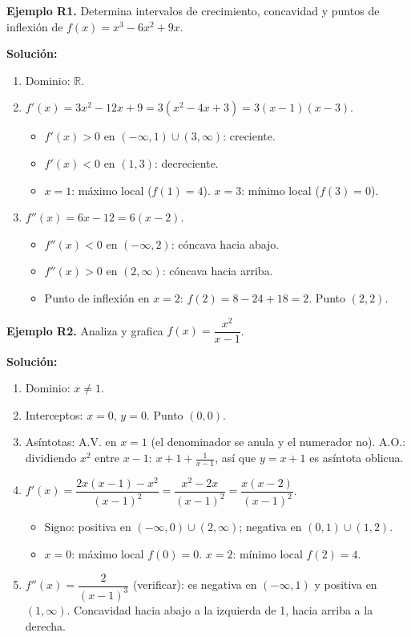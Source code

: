 \documentclass[12pt, letterpaper]{article}
\begin{document}
\textbf{Ejemplo R1.} Determina intervalos de crecimiento, concavidad y puntos de inflexión de $f(x) = x^3 - 6x^2 + 9x$.

\begin{cuadrosolucion}
  \textbf{Solución:}
  \begin{enumerate}
    \item Dominio: $\mathbb{R}$.
    \item $f'(x) = 3x^2 - 12x + 9 = 3(x^2 - 4x + 3) = 3(x - 1)(x - 3)$.
          \begin{itemize}
            \item $f'(x) > 0$ en $(-\infty, 1) \cup (3, \infty)$: creciente.
            \item $f'(x) < 0$ en $(1, 3)$: decreciente.
            \item $x = 1$: máximo local ($f(1) = 4$). $x = 3$: mínimo local ($f(3) = 0$).
          \end{itemize}
    \item $f''(x) = 6x - 12 = 6(x - 2)$.
          \begin{itemize}
            \item $f''(x) < 0$ en $(-\infty, 2)$: cóncava hacia abajo.
            \item $f''(x) > 0$ en $(2, \infty)$: cóncava hacia arriba.
            \item Punto de inflexión en $x = 2$: $f(2) = 8 - 24 + 18 = 2$. Punto $(2, 2)$.
          \end{itemize}
  \end{enumerate}
\end{cuadrosolucion}

\textbf{Ejemplo R2.} Analiza y grafica $f(x) = \dfrac{x^2}{x - 1}$.

\begin{cuadrosolucion}
  \textbf{Solución:}
  \begin{enumerate}
    \item Dominio: $x \neq 1$.
    \item Interceptos: $x = 0$, $y = 0$. Punto $(0, 0)$.
    \item Asíntotas: A.V. en $x = 1$ (el denominador se anula y el numerador no). A.O.: dividiendo $x^2$ entre $x - 1$: $x + 1 + \frac{1}{x-1}$, así que $y = x + 1$ es asíntota oblicua.
    \item $f'(x) = \dfrac{2x(x - 1) - x^2}{(x - 1)^2} = \dfrac{x^2 - 2x}{(x - 1)^2} = \dfrac{x(x - 2)}{(x - 1)^2}$.
          \begin{itemize}
            \item Signo: positiva en $(-\infty, 0) \cup (2, \infty)$; negativa en $(0, 1) \cup (1, 2)$.
            \item $x = 0$: máximo local $f(0) = 0$. $x = 2$: mínimo local $f(2) = 4$.
          \end{itemize}
    \item $f''(x) = \dfrac{2}{(x - 1)^3}$ (verificar): es negativa en $(-\infty, 1)$ y positiva en $(1, \infty)$. Concavidad hacia abajo a la izquierda de 1, hacia arriba a la derecha.
  \end{enumerate}
\end{cuadrosolucion}
\end{document}
